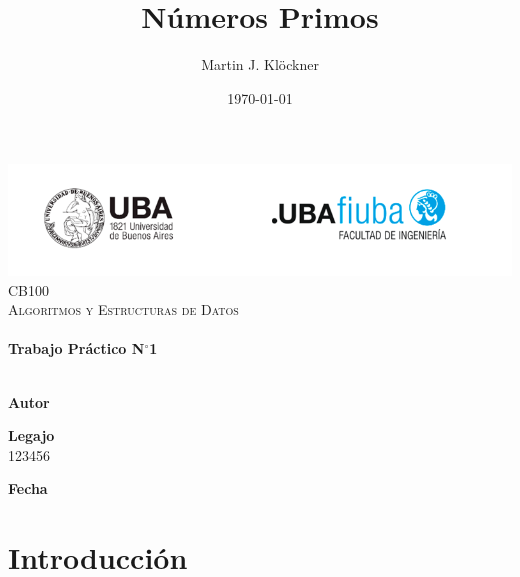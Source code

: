 \documentclass[12pt]{article}
\title{Números Primos}          %
\author{Martin J. Klöckner}     %
\date{\today}                   %
\makeatletter
\newcommand{\padron}{123456}    %
\newcommand{\tpnumber}{1}       %
\let\thetitle\@title
\let\theauthor\@author
\let\thedate\@date
\makeatother
\begin{document}
\begin{titlepage}
    \includegraphics[scale = 0.75]{img/logofiuba.png}\\[1.5 cm]	    %
    \centering
	\textsc{\Large CB100}\\[0.2 cm]
	\textsc{\large Algoritmos y Estructuras de Datos}\\[4 cm]
	\textcolor{cyan}{{\fontsize{40}{60}\selectfont \bfseries \thetitle}}\\[0.5cm]
	{\Large \bfseries Trabajo Práctico N$^\circ$\tpnumber}\\[5cm]
	

    \vfill
    \noindent\makebox[\linewidth]{\rule{\textwidth}{0.4pt}}\\[0.5cm]
    \begin{minipage}{.46\textwidth}
    \textbf{Autor}\\
    \theauthor
    \end{minipage}%
    \begin{minipage}{.34\textwidth}
    \textbf{Legajo}\\
    \padron
    \end{minipage}%
    \begin{minipage}{.2\textwidth}
     \begin{flushright}
        \textbf{Fecha}\\
        \thedate
    \end{flushright}
    \end{minipage}
\end{titlepage}


{
    \hypersetup{linkcolor=black} %
    \tableofcontents
    \pagebreak
}


\section{Introducción}
\end{document}
